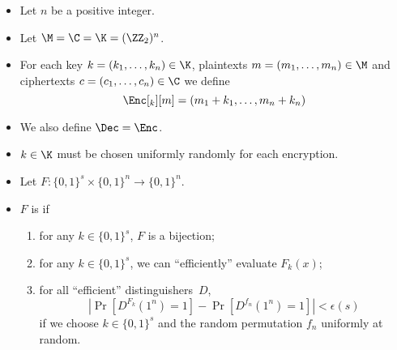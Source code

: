 \begin{frame}
  \begin{example}
    \begin{itemize}
      \item Let \(n\) be a positive integer.
      \item Let \(\M = \C = \K = (\ZZ_2)^n\).

        \pause{}

      \item For each key \(k = (k_1, \ldots, k_n)\in \K\), plaintexts \(m 
          = (m_1, \ldots, m_n)\in \M\) and ciphertexts \(c = (c_1, \ldots, 
          c_n)\in \C\) we define
        \[\Enc[_k][m] = (m_1 + k_1, \ldots, m_n + k_n)\]

        \pause{}

      \item We also define \(\Dec = \Enc\).

        \pause{}

      \item \(k\in \K\) must be chosen uniformly randomly for each encryption.
    \end{itemize}
  \end{example}
\end{frame}

\begin{frame}
  \begin{definition}
    \begin{itemize}
      \item Let \(F\colon \{0,1\}^s\times \{0, 1\}^n\to \{0,1\}^n\).

        \pause{}

      \item \(F\) is  if
        \begin{enumerate}
          \item for any \(k\in \{0, 1\}^s\), \(F\) is a bijection;

            \pause{}

          \item for any \(k\in \{0, 1\}^s\), we can \enquote{efficiently} 
            evaluate \(F_k(x)\);

            \pause{}

          \item for all \enquote{efficient} distinguishers~\(D\),
            \[\left|\Pr[D^{F_k}(1^n) = 1] - \Pr[D^{f_n}(1^n) = 1]\right| 
              < \epsilon(s)\] if we choose \(k\in \{0,1\}^s\) and the random 
            permutation \(f_n\) uniformly at random.
        \end{enumerate}
    \end{itemize}
  \end{definition}
\end{frame}



\begin{frame}[allowframebreaks]
  \printbibliography{}
\end{frame}


